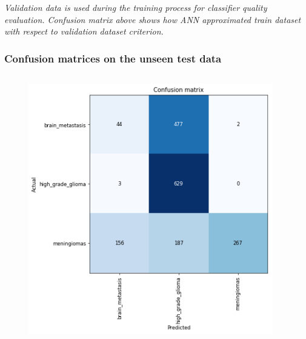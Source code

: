 \documentclass{beamer}
\begin{document}
\begin{frame}
\begin{columns}
\begin{column}{0.55\textwidth}
\begin{figure}
		\end{figure}
	\end{column}
\end{columns}
\textit{Validation data is used during the training process for classifier quality evaluation. Confusion matrix above shows how ANN approximated train dataset with respect to validation dataset criterion.}
\end{frame}


\begin{frame}
\frametitle{Confusion matrices on the unseen test data}
\begin{columns}
	\begin{column}{0.5\textwidth}
		\begin{figure}
			\centering
			\includegraphics[width=\textwidth]{images/confusion_1.png}
		\end{figure}
	\end{column}
	\begin{column}{0.5\textwidth}
		\centering

\end{column}
\end{columns}
\end{frame}
\end{document}
